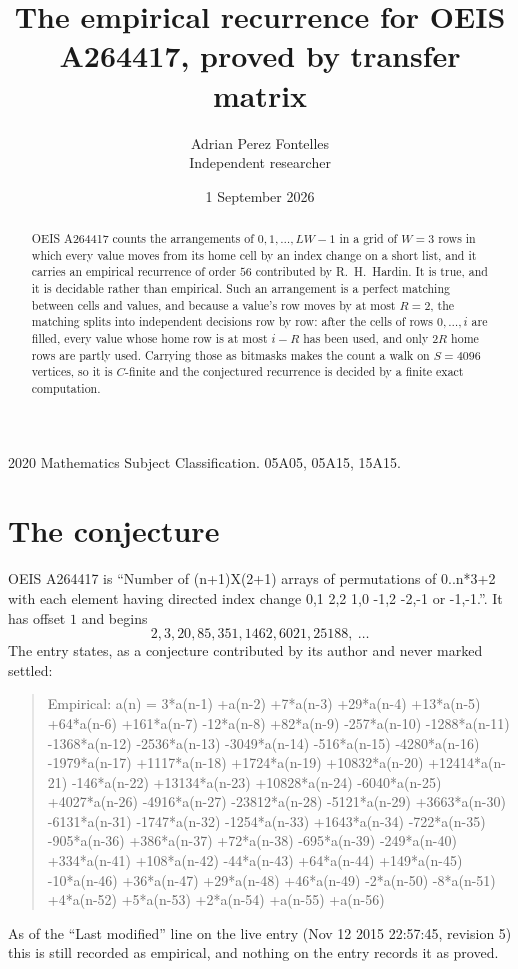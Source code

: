 \documentclass[11pt,a4paper]{article}
\title{The empirical recurrence for OEIS A264417, proved by transfer matrix}
\author{Adrian Perez Fontelles\\ \small Independent researcher}
\date{1 September 2026}
\theoremstyle{plain}
\theoremstyle{definition}
\begin{document}
\maketitle

\begin{abstract}
OEIS A264417 counts the arrangements of $0,1,\dots,LW-1$ in a grid of $W=3$ rows in which
every value moves from its home cell by an index change on a short list, and it carries an
empirical recurrence of order $56$ contributed by R.~H.~Hardin. It is true, and it is
decidable rather than empirical. Such an arrangement is a perfect matching between cells and
values, and because a value's row moves by at most $R=2$, the matching splits into
independent decisions row by row: after the cells of rows $0,\dots,i$ are filled,
every value whose home row is at most $i-R$ has been used, and only $2R$ home rows are
partly used. Carrying those as bitmasks makes the count a walk on $S=4096$ vertices, so it is
$C$-finite and the conjectured recurrence is decided by a finite exact computation.
\end{abstract}

\noindent\small 2020 Mathematics Subject Classification. 05A05, 05A15, 15A15.\normalsize

\section{The conjecture}

OEIS A264417 is ``Number of (n+1)X(2+1) arrays of permutations of 0..n*3+2 with each element having directed index change 0,1 2,2 1,0 -1,2 -2,-1 or -1,-1.''. It has offset $1$ and begins
\[
2, 3, 20, 85, 351, 1462, 6021, 25188,\ \dots
\]
The entry states, as a conjecture contributed by its author and never marked settled:
\begin{quote}
Empirical: a(n) = 3*a(n-1) +a(n-2) +7*a(n-3) +29*a(n-4) +13*a(n-5) +64*a(n-6) +161*a(n-7) -12*a(n-8) +82*a(n-9) -257*a(n-10) -1288*a(n-11) -1368*a(n-12) -2536*a(n-13) -3049*a(n-14) -516*a(n-15) -4280*a(n-16) -1979*a(n-17) +1117*a(n-18) +1724*a(n-19) +10832*a(n-20) +12414*a(n-21) -146*a(n-22) +13134*a(n-23) +10828*a(n-24) -6040*a(n-25) +4027*a(n-26) -4916*a(n-27) -23812*a(n-28) -5121*a(n-29) +3663*a(n-30) -6131*a(n-31) -1747*a(n-32) -1254*a(n-33) +1643*a(n-34) -722*a(n-35) -905*a(n-36) +386*a(n-37) +72*a(n-38) -695*a(n-39) -249*a(n-40) +334*a(n-41) +108*a(n-42) -44*a(n-43) +64*a(n-44) +149*a(n-45) -10*a(n-46) +36*a(n-47) +29*a(n-48) +46*a(n-49) -2*a(n-50) -8*a(n-51) +4*a(n-52) +5*a(n-53) +2*a(n-54) +a(n-55) +a(n-56)
\end{quote}
As of the ``Last modified'' line on the live entry (Nov 12 2015 22:57:45, revision 5) this is still
recorded as empirical, and nothing on the entry records it as proved.
\end{document}
